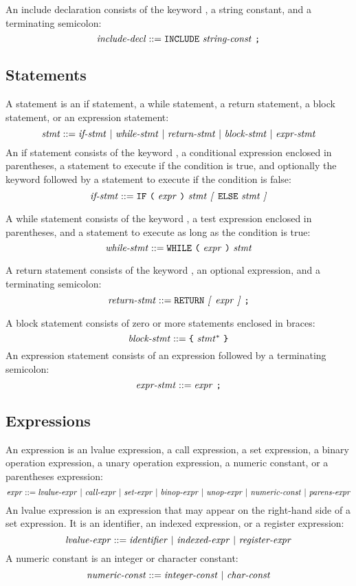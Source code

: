 \documentclass[10pt]{article}
\begin{document}
 An include declaration consists of the
keyword , a string constant, and a terminating semicolon:
%
$$\mbox{\textit{include-decl}} ::= \mbox{\texttt{INCLUDE}
  \ensuremath{\mbox{\textit{string-const}}} \texttt{;}}$$
%

\subsection{Statements}
\label{sec:syntax:statements}

A statement is an if statement, a while statement, a return statement,
a block statement, or an expression statement:
%
$$\mbox{\textit{stmt}} ::= \mbox{\ensuremath{\mbox{\textit{if-stmt}}} $|$ \ensuremath{\mbox{\textit{while-stmt}}}
  $|$ \ensuremath{\mbox{\textit{return-stmt}}} $|$ \ensuremath{\mbox{\textit{block-stmt}}} $|$
  \ensuremath{\mbox{\textit{expr-stmt}}}}$$
%
 An if statement consists of the keyword
, a conditional expression enclosed in parentheses, a
statement to execute if the condition is true, and optionally the
keyword  followed by a statement to execute if the condition
is false:
%
$$\mbox{\textit{if-stmt}} ::= \mbox{\texttt{IF} \texttt{(} \ensuremath{\mbox{\textit{expr}}} \texttt{)}
  \ensuremath{\mbox{\textit{stmt}}} \textit{[} \texttt{ELSE} \ensuremath{\mbox{\textit{stmt}}} \textit{]}}$$
%

 A while statement consists of the keyword
, a test expression enclosed in parentheses, and a
statement to execute as long as the condition is true:
%
$$\mbox{\textit{while-stmt}} ::= \mbox{\texttt{WHILE} \texttt{(} \ensuremath{\mbox{\textit{expr}}}
  \texttt{)} \ensuremath{\mbox{\textit{stmt}}}}$$
%

 A return statement consists of the keyword
, an optional expression, and a terminating semicolon:
%
$$\mbox{\textit{return-stmt}} ::= \mbox{\texttt{RETURN} \textit{[} \ensuremath{\mbox{\textit{expr}}} \textit{]}
    \texttt{;}}$$
%

 A block statement consists of zero or more
statements enclosed in braces:
%
$$\mbox{\textit{block-stmt}} ::= \mbox{\texttt{\{} \ensuremath{\mbox{\textit{stmt}}}$^*$
  \texttt{\}}}$$
%
 An expression statement consists of an
expression followed by a terminating semicolon:
%
$$\mbox{\textit{expr-stmt}} ::= \mbox{\ensuremath{\mbox{\textit{expr}}} \texttt{;}}$$
%

\subsection{Expressions}
\label{sec:syntax:expressions}

An expression is an lvalue expression, a call expression, a set
expression, a binary operation expression, a unary operation
expression, a numeric constant, or a parentheses expression:
%
$$\mbox{\textit{expr}} ::= \mbox{\ensuremath{\mbox{\textit{lvalue-expr}}} $|$
  \ensuremath{\mbox{\textit{call-expr}}} $|$ \ensuremath{\mbox{\textit{set-expr}}} $|$ \ensuremath{\mbox{\textit{binop-expr}}}
  $|$ \ensuremath{\mbox{\textit{unop-expr}}} $|$ \ensuremath{\mbox{\textit{numeric-const}}} $|$
  \ensuremath{\mbox{\textit{parens-expr}}}}$$
%
An lvalue expression is an expression that may appear on the
right-hand side of a set expression.  It is an identifier, an indexed
expression, or a register expression:
%
$$\mbox{\textit{lvalue-expr}} ::= \mbox{\ensuremath{\mbox{\textit{identifier}}} $|$
  \ensuremath{\mbox{\textit{indexed-expr}}} $|$ \ensuremath{\mbox{\textit{register-expr}}}}$$
%
A numeric constant is an integer or character constant:
%
$$\mbox{\textit{numeric-const}} ::= \mbox{\ensuremath{\mbox{\textit{integer-const}}} $|$
  \ensuremath{\mbox{\textit{char-const}}}}$$
%
\end{document}
